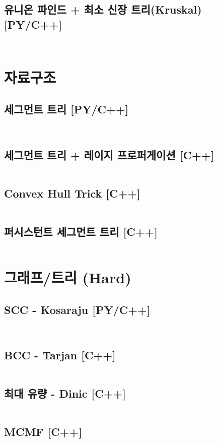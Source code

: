 \documentclass[landscape,8pt,a4paper,twocolumn]{extarticle}
\begin{document}
\subsection{유니온 파인드 + 최소 신장 트리(Kruskal) [PY/C++]}
\inputminted{python}{python/Graph1/Kruskal.py}
\inputminted{cpp}{mixed/cpp/Graph1/Kruskal.hpp}
\section{자료구조}
\subsection{세그먼트 트리 [PY/C++]}
\inputminted{python}{python/DataStructure/SegmentTree.py}
\inputminted{cpp}{mixed/cpp/DataStructure/SegmentTree.hpp}
\subsection{세그먼트 트리 + 레이지 프로퍼게이션 [C++]}
\inputminted{cpp}{mixed/cpp/DataStructure/SegmentTreeLazy.hpp}
\subsection{Convex Hull Trick [C++]}
\inputminted{cpp}{mixed/cpp/DataStructure/ConvexHullTrick.hpp}
\subsection{퍼시스턴트 세그먼트 트리 [C++]}
\inputminted{cpp}{mixed/cpp/DataStructure/PersistentSegmentTree.hpp}
\section{그래프/트리 (Hard)}
\subsection{SCC - Kosaraju [PY/C++]}
\inputminted{python}{python/Graph2/SCC.py}
\inputminted{cpp}{mixed/cpp/Graph2/SCC.hpp}
\subsection{BCC - Tarjan [C++]}
\inputminted{cpp}{mixed/cpp/Graph2/BCC.hpp}
\subsection{최대 유량 - Dinic [C++]}
\inputminted{cpp}{mixed/cpp/Graph2/Dinic.hpp}
\subsection{MCMF [C++]}
\inputminted{cpp}{mixed/cpp/Graph2/MCMF.hpp}
\end{document}
